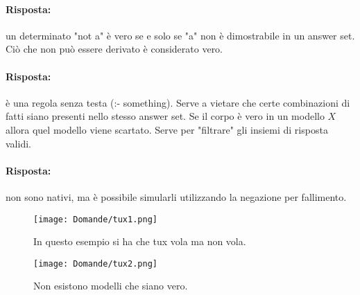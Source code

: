 \paragraph{Risposta:} un determinato "not a" è vero se e solo se "a" non è dimostrabile in un answer set. Ciò che non può essere derivato è considerato vero.


\paragraph{Risposta:} è una regola senza testa (:- something). Serve a vietare che certe combinazioni di fatti siano presenti nello stesso answer set. Se il corpo è vero in un modello $X$ allora quel modello viene scartato. Serve per "filtrare" gli insiemi di risposta validi.


\paragraph{Risposta:} non sono nativi, ma è possibile simularli utilizzando la negazione per fallimento. 


\begin{figure}[h]
    \centering
    \begin{minipage}{0.45\textwidth}
        \centering
        \texttt{[image: Domande/tux1.png]}
        \caption{In questo esempio si ha che tux vola ma non vola.}
    \end{minipage}
    \hfill
    \begin{minipage}{0.45\textwidth}
        \centering
        \texttt{[image: Domande/tux2.png]}
        \caption{Non esistono modelli che siano vero.}
    \end{minipage}
\end{figure}






